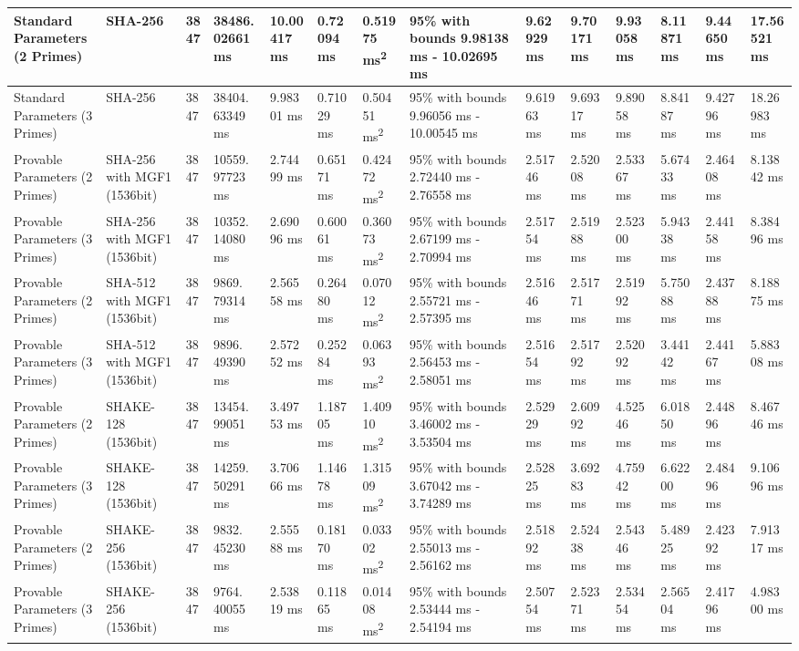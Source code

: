 \documentclass[]{final_report}
\theoremstyle{definition}
\begin{document}
\begin{landscape}
\begin{longtable}{|p{2.3cm}|p{1.8cm}|p{1.0cm}|p{1.7cm}|p{1.4cm}|p{1.5cm}|p{1.8cm}|p{1.5cm}|p{1.43cm}|p{1.5cm}|p{1.3cm}|p{1.4cm}|p{1.3cm}|p{1.3cm}|}
\hline
\endlastfoot
Standard Parameters (2 Primes) & SHA-256 & 3847 & 38486.
02661 ms & 10.00417 ms & 0.72094 ms & 0.51975 ms\textsuperscript{2} & 95\% with bounds 9.98138 ms - 10.02695 ms & 9.62929 ms & 9.70171 ms & 9.93058 ms & 8.11871 ms & 9.44650 ms & 17.56521 ms \\
\hline
Standard Parameters (3 Primes) & SHA-256 & 3847 & 38404.
63349 ms & 9.98301 ms & 0.71029 ms & 0.50451 ms\textsuperscript{2} & 95\% with bounds 9.96056 ms - 10.00545 ms & 9.61963 ms & 9.69317 ms & 9.89058 ms & 8.84187 ms & 9.42796 ms & 18.26983 ms \\
\hline
Provable Parameters (2 Primes) & SHA-256 with MGF1 (1536bit) & 3847 & 10559.
97723 ms & 2.74499 ms & 0.65171 ms & 0.42472 ms\textsuperscript{2} & 95\% with bounds 2.72440 ms - 2.76558 ms & 2.51746 ms & 2.52008 ms & 2.53367 ms & 5.67433 ms & 2.46408 ms & 8.13842 ms \\
\hline
Provable Parameters (3 Primes) & SHA-256 with MGF1 (1536bit) & 3847 & 10352.
14080 ms & 2.69096 ms & 0.60061 ms & 0.36073 ms\textsuperscript{2} & 95\% with bounds 2.67199 ms - 2.70994 ms & 2.51754 ms & 2.51988 ms & 2.52300 ms & 5.94338 ms & 2.44158 ms & 8.38496 ms \\
\hline
Provable Parameters (2 Primes) & SHA-512 with MGF1 (1536bit) & 3847 & 9869.
79314 ms & 2.56558 ms & 0.26480 ms & 0.07012 ms\textsuperscript{2} & 95\% with bounds 2.55721 ms - 2.57395 ms & 2.51646 ms & 2.51771 ms & 2.51992 ms & 5.75088 ms & 2.43788 ms & 8.18875 ms \\
\hline
Provable Parameters (3 Primes) & SHA-512 with MGF1 (1536bit) & 3847 & 9896.
49390 ms & 2.57252 ms & 0.25284 ms & 0.06393 ms\textsuperscript{2} & 95\% with bounds 2.56453 ms - 2.58051 ms & 2.51654 ms & 2.51792 ms & 2.52092 ms & 3.44142 ms & 2.44167 ms & 5.88308 ms \\
\hline
Provable Parameters (2 Primes) & SHAKE-128 (1536bit) & 3847 & 13454.
99051 ms & 3.49753 ms & 1.18705 ms & 1.40910 ms\textsuperscript{2} & 95\% with bounds 3.46002 ms - 3.53504 ms & 2.52929 ms & 2.60992 ms & 4.52546 ms & 6.01850 ms & 2.44896 ms & 8.46746 ms \\
\hline
Provable Parameters (3 Primes) & SHAKE-128 (1536bit) & 3847 & 14259.
50291 ms & 3.70666 ms & 1.14678 ms & 1.31509 ms\textsuperscript{2} & 95\% with bounds 3.67042 ms - 3.74289 ms & 2.52825 ms & 3.69283 ms & 4.75942 ms & 6.62200 ms & 2.48496 ms & 9.10696 ms \\
\hline
Provable Parameters (2 Primes) & SHAKE-256 (1536bit) & 3847 & 9832.
45230 ms & 2.55588 ms & 0.18170 ms & 0.03302 ms\textsuperscript{2} & 95\% with bounds 2.55013 ms - 2.56162 ms & 2.51892 ms & 2.52438 ms & 2.54346 ms & 5.48925 ms & 2.42392 ms & 7.91317 ms \\
\hline
Provable Parameters (3 Primes) & SHAKE-256 (1536bit) & 3847 & 9764.
40055 ms & 2.53819 ms & 0.11865 ms & 0.01408 ms\textsuperscript{2} & 95\% with bounds 2.53444 ms - 2.54194 ms & 2.50754 ms & 2.52371 ms & 2.53454 ms & 2.56504 ms & 2.41796 ms & 4.98300 ms \\
\hline



\end{longtable}
\end{landscape}
\end{document}
